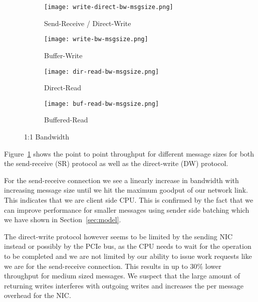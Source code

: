 \begin{figure}[htp]
\begin{subfigure}[b]{0.49\textwidth}
  \centering
  \texttt{[image: write-direct-bw-msgsize.png]}
  \caption{Send-Receive / Direct-Write}
  \label{fig:plot-sr-dw-bw}
\end{subfigure}
\begin{subfigure}[b]{0.49\textwidth}
  \centering
  \texttt{[image: write-bw-msgsize.png]}
  \caption{Buffer-Write}
  \label{fig:plot-bw-bw}
\end{subfigure}
\begin{subfigure}[b]{0.49\textwidth}
  \centering
  \texttt{[image: dir-read-bw-msgsize.png]}
  \caption{Direct-Read}
  \label{fig:plot-dr-bw}
\end{subfigure}
\begin{subfigure}[b]{0.49\textwidth}
  \centering
  \texttt{[image: buf-read-bw-msgsize.png]}
  \caption{Buffered-Read}
  \label{fig:plot-br-bw}
\end{subfigure}
  \caption{1:1 Bandwidth}
  \label{fig:plot-br-bw}
\end{figure}

Figure~\ref{fig:plot-sr-dw-bw} shows the point to point throughput for different message sizes for both the send-receive (SR)
protocol as well as the direct-write (DW) protocol. 

For the send-receive connection we see a linearly increase in bandwidth with increasing message size until we hit the
maximum goodput of our network link. This indicates that we are client side CPU. This is confirmed by the fact that we can
improve performance for smaller messages using sender side batching which we have shown in Section~\ref{sec:model}.

The direct-write protocol however seems to be limited by the sending NIC instead or possibly by the PCIe bus, as the CPU needs
to wait for the operation to be completed and we are not limited by our ability to issue work requests like we are for the 
send-receive connection. This results in up to 30\% lower throughput for medium sized messages. We suspect that the large 
amount of returning writes interferes with outgoing writes and increases the per message overhead for the NIC. 
 

